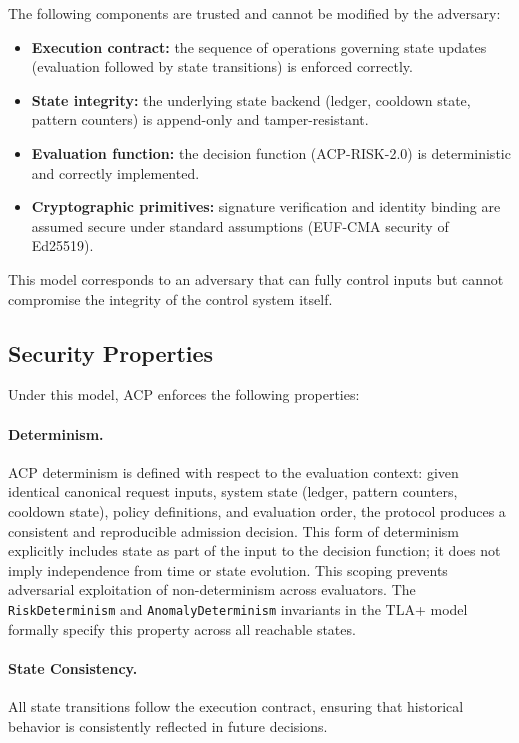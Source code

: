 \documentclass[11pt]{article}
\theoremstyle{definition}
\begin{document}
The following components are trusted and cannot be modified by the adversary:

\begin{itemize}[noitemsep]
  \item \textbf{Execution contract:} the sequence of operations governing state updates
    (evaluation followed by state transitions) is enforced correctly.
  \item \textbf{State integrity:} the underlying state backend (ledger, cooldown state,
    pattern counters) is append-only and tamper-resistant.
  \item \textbf{Evaluation function:} the decision function (ACP-RISK-2.0) is deterministic
    and correctly implemented.
  \item \textbf{Cryptographic primitives:} signature verification and identity binding are
    assumed secure under standard assumptions (EUF-CMA security of Ed25519).
\end{itemize}

This model corresponds to an adversary that can fully control inputs but cannot compromise
the integrity of the control system itself.

\subsection{Security Properties}

Under this model, ACP enforces the following properties:

\paragraph{Determinism.}
ACP determinism is defined with respect to the evaluation context: given identical
canonical request inputs, system state (ledger, pattern counters, cooldown state),
policy definitions, and evaluation order, the protocol produces a consistent and
reproducible admission decision.
This form of determinism explicitly includes state as part of the input to the decision
function; it does not imply independence from time or state evolution.
This scoping prevents adversarial exploitation of non-determinism across evaluators.
The \texttt{RiskDeterminism} and \texttt{AnomalyDeterminism} invariants in the TLA+
model formally specify this property across all reachable states.

\paragraph{State Consistency.}
All state transitions follow the execution contract, ensuring that historical behavior
is consistently reflected in future decisions.
\end{document}
